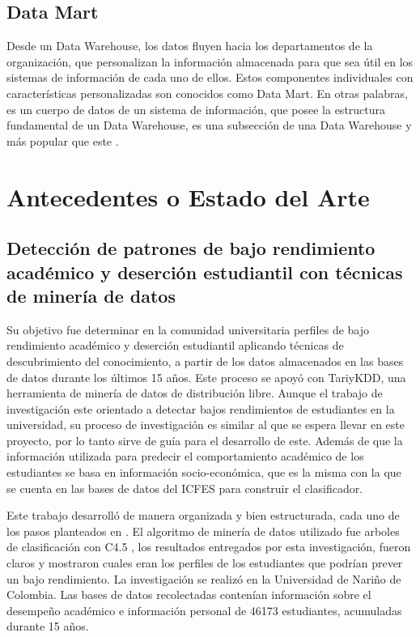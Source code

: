 \subsection{Data Mart}
Desde un Data Warehouse, los datos fluyen hacia los departamentos de la organización, que personalizan la información almacenada para que sea útil en los sistemas de información de cada uno de ellos. Estos componentes individuales con características personalizadas son conocidos como Data Mart. En otras palabras, es un cuerpo de datos de un sistema de información, que posee la estructura fundamental de un Data Warehouse, es una subsección de una Data Warehouse y más popular que este \cite{key-90}.
\section{Antecedentes o Estado del Arte}
\subsection{Detección de patrones de bajo rendimiento académico y deserción estudiantil con técnicas de minería de datos \cite{key-100}}
Su objetivo fue determinar en la comunidad universitaria perfiles de bajo rendimiento académico y deserción estudiantil aplicando técnicas de descubrimiento del conocimiento, a partir de los datos almacenados en las bases de datos durante los últimos 15 años. Este proceso se apoyó con TariyKDD, una herramienta de minería de datos de distribución libre. Aunque el trabajo de investigación este orientado a detectar bajos rendimientos de estudiantes en la universidad, su proceso de investigación es similar al que se espera llevar en este proyecto, por lo tanto sirve de guía para el desarrollo de este. Además de que la información utilizada para predecir el comportamiento académico de los estudiantes se basa en información socio-económica, que es la misma con la que se cuenta en las bases de datos del ICFES para construir el clasificador.

Este trabajo desarrolló de manera organizada y bien estructurada, cada uno de los pasos planteados en \cite{key-50}. El algoritmo de minería de datos utilizado fue arboles de clasificación con C4.5 \cite{key-50, key-70}, los resultados entregados por esta investigación, fueron claros y mostraron cuales eran los perfiles de los estudiantes que podrían prever un bajo rendimiento.
La investigación se realizó en la Universidad de Nariño de Colombia. Las bases de datos recolectadas contenían información sobre el desempeño académico e información personal de 46173 estudiantes, acumuladas durante 15 años.

